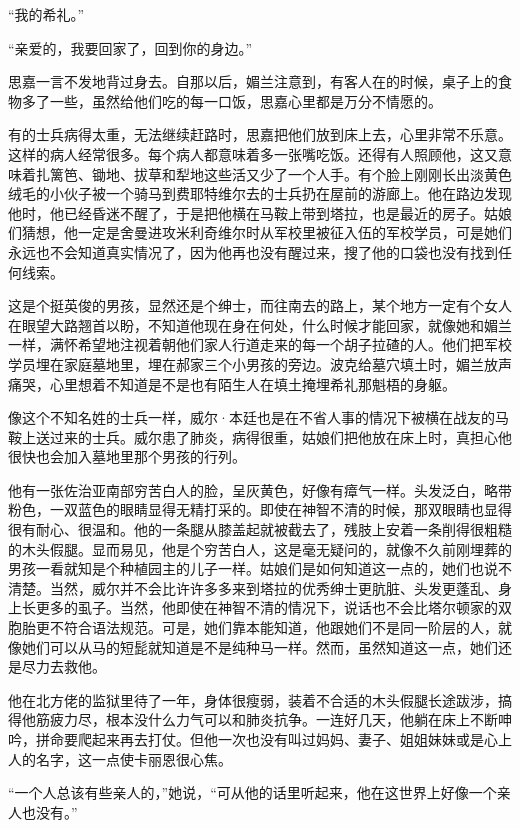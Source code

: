\par “我的希礼。”
\par “亲爱的，我要回家了，回到你的身边。”
\par 思嘉一言不发地背过身去。自那以后，媚兰注意到，有客人在的时候，桌子上的食物多了一些，虽然给他们吃的每一口饭，思嘉心里都是万分不情愿的。
\par 有的士兵病得太重，无法继续赶路时，思嘉把他们放到床上去，心里非常不乐意。这样的病人经常很多。每个病人都意味着多一张嘴吃饭。还得有人照顾他，这又意味着扎篱笆、锄地、拔草和犁地这些活又少了一个人手。有个脸上刚刚长出淡黄色绒毛的小伙子被一个骑马到费耶特维尔去的士兵扔在屋前的游廊上。他在路边发现他时，他已经昏迷不醒了，于是把他横在马鞍上带到塔拉，也是最近的房子。姑娘们猜想，他一定是舍曼进攻米利奇维尔时从军校里被征入伍的军校学员，可是她们永远也不会知道真实情况了，因为他再也没有醒过来，搜了他的口袋也没有找到任何线索。
\par 这是个挺英俊的男孩，显然还是个绅士，而往南去的路上，某个地方一定有个女人在眼望大路翘首以盼，不知道他现在身在何处，什么时候才能回家，就像她和媚兰一样，满怀希望地注视着朝他们家人行道走来的每一个胡子拉碴的人。他们把军校学员埋在家庭墓地里，埋在郝家三个小男孩的旁边。波克给墓穴填土时，媚兰放声痛哭，心里想着不知道是不是也有陌生人在填土掩埋希礼那魁梧的身躯。
\par 像这个不知名姓的士兵一样，威尔·本廷也是在不省人事的情况下被横在战友的马鞍上送过来的士兵。威尔患了肺炎，病得很重，姑娘们把他放在床上时，真担心他很快也会加入墓地里那个男孩的行列。
\par 他有一张佐治亚南部穷苦白人的脸，呈灰黄色，好像有瘴气一样。头发泛白，略带粉色，一双蓝色的眼睛显得无精打采的。即使在神智不清的时候，那双眼睛也显得很有耐心、很温和。他的一条腿从膝盖起就被截去了，残肢上安着一条削得很粗糙的木头假腿。显而易见，他是个穷苦白人，这是毫无疑问的，就像不久前刚埋葬的男孩一看就知是个种植园主的儿子一样。姑娘们是如何知道这一点的，她们也说不清楚。当然，威尔并不会比许许多多来到塔拉的优秀绅士更肮脏、头发更蓬乱、身上长更多的虱子。当然，他即使在神智不清的情况下，说话也不会比塔尔顿家的双胞胎更不符合语法规范。可是，她们靠本能知道，他跟她们不是同一阶层的人，就像她们可以从马的短髭就知道是不是纯种马一样。然而，虽然知道这一点，她们还是尽力去救他。
\par 他在北方佬的监狱里待了一年，身体很瘦弱，装着不合适的木头假腿长途跋涉，搞得他筋疲力尽，根本没什么力气可以和肺炎抗争。一连好几天，他躺在床上不断呻吟，拼命要爬起来再去打仗。但他一次也没有叫过妈妈、妻子、姐姐妹妹或是心上人的名字，这一点使卡丽恩很心焦。
\par “一个人总该有些亲人的，”她说，“可从他的话里听起来，他在这世界上好像一个亲人也没有。”
